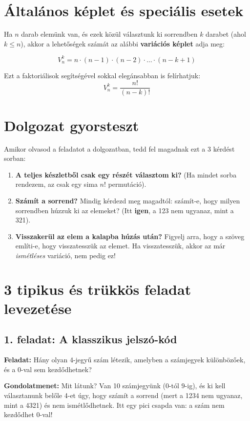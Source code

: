 \documentclass[11pt,a4paper]{article}
\begin{document}
\section{Általános képlet és speciális esetek}
Ha $n$ darab elemünk van, és ezek közül választunk ki sorrendben $k$ darabet (ahol $k \le n$), akkor a lehetőségek számát az alábbi \textbf{variációs képlet} adja meg:

\[ V_n^k = n \cdot (n-1) \cdot (n-2) \cdot \dots \cdot (n - k + 1) \]

Ezt a faktoriálisok segítségével sokkal elegánsabban is felírhatjuk:
\[ V_n^k = \frac{n!}{(n-k)!} \]


\section{Dolgozat gyorsteszt}
Amikor olvasod a feladatot a dolgozatban, tedd fel magadnak ezt a 3 kérdést sorban:
\begin{enumerate}
    \item \textbf{A teljes készletből csak egy részét választom ki?} (Ha mindet sorba rendezem, az csak egy sima $n!$ permutáció).
    \item \textbf{Számít a sorrend?} Mindig kérdezd meg magadtól: számít-e, hogy milyen sorrendben húzzuk ki az elemeket? (Itt \textbf{igen}, a 123 nem ugyanaz, mint a 321).
    \item \textbf{Visszakerül az elem a kalapba húzás után?} Figyelj arra, hogy a szöveg említi-e, hogy visszatesszük az elemet. Ha visszatesszük, akkor az már \emph{ismétléses} variáció, nem pedig ez!
\end{enumerate}

\section{3 tipikus és trükkös feladat levezetése}

\subsection*{1. feladat: A klasszikus jelszó-kód}
\textbf{Feladat:} Hány olyan 4-jegyű szám létezik, amelyben a számjegyek különbözőek, és a 0-val sem kezdődhetnek?

\noindent\textbf{Gondolatmenet:} 
Mit látunk? Van 10 számjegyünk ($0$-tól $9$-ig), és ki kell választanunk belőle 4-et úgy, hogy számít a sorrend (mert a 1234 nem ugyanaz, mint a 4321) és nem ismétlődhetnek. 
Itt egy pici csapda van: a szám nem kezdődhet 0-val!
\end{document}
